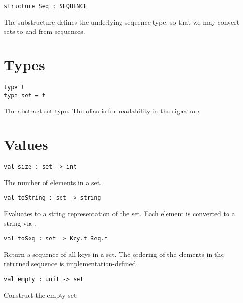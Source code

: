 \begin{gram}
\begin{verbatim}
structure Seq : SEQUENCE
\end{verbatim}
The  substructure defines the underlying sequence type, so that we
may convert sets to and from sequences.
\end{gram}


\section{Types}

\begin{gram}
\begin{verbatim}
type t
type set = t
\end{verbatim}
The abstract set type. The alias  is for readability in the
signature.
\end{gram}


\section{Values}

\begin{gram}[size]
\begin{verbatim}
val size : set -> int
\end{verbatim}
The number of elements in a set.
\end{gram}

\begin{gram}[toString]
\begin{verbatim}
val toString : set -> string
\end{verbatim}
Evaluates to a string representation of the set. Each element is converted to
a string via .
\end{gram}

\begin{gram}[toSeq]
\begin{verbatim}
val toSeq : set -> Key.t Seq.t
\end{verbatim}
Return a sequence of all keys in a set. The ordering of the elements in the
returned sequence is implementation-defined.
\end{gram}

\begin{gram}[empty]
\begin{verbatim}
val empty : unit -> set
\end{verbatim}
Construct the empty set.
\end{gram}

